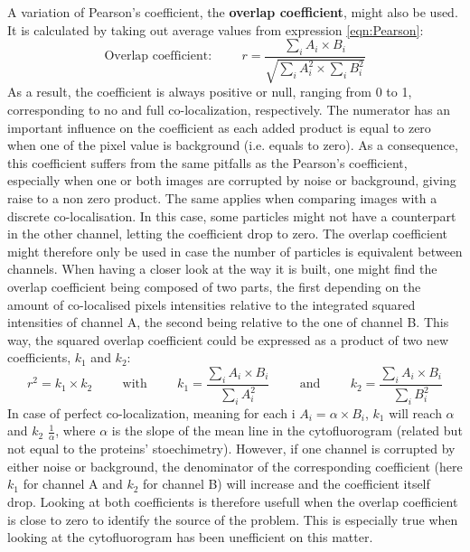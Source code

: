 \documentclass[]{spie}  %
\begin{document}
A variation of Pearson's coefficient, the \textbf{overlap coefficient}\cite{Manders1993}, might also be used. It is calculated by taking out average values from expression \ref{eqn:Pearson}:
\begin{equation}
\mbox{Overlap coefficient:} \hspace{1cm}r=\frac{\sum_{i}A_i\times B_i}{\sqrt{\sum_{i}A_i^2\times\sum_iB_i^2}}
\label{eqn:Overlap}
\end{equation}
As a result, the coefficient is always positive or null, ranging from 0 to 1, corresponding to no and full co-localization, respectively. The numerator has an important influence on the coefficient as each added product is equal to zero when one of the pixel value is background (i.e. equals to zero). As a consequence, this coefficient suffers from the same pitfalls as the Pearson's coefficient, especially when one or both images are corrupted by noise or background, giving raise to a non zero product. The same applies when comparing images with a discrete co-localisation. In this case, some particles might not have a counterpart in the other channel, letting the coefficient drop to zero. The overlap coefficient might therefore only be used in case the number of particles is equivalent between channels. When having a closer look at the way it is built, one might find the overlap coefficient being composed of two parts, the first depending on the amount of co-localised pixels intensities relative to the integrated squared intensities of channel A, the second being relative to the one of channel B. This way, the squared overlap coefficient could be expressed as a product of two new coefficients, \textbf{$k_1$} and \textbf{$k_2$}:
\begin{equation}
r^2=k_1\times k_2 \hspace{1cm} \mbox{with} \hspace{1cm} k_1=\frac{\sum_{i}A_i\times B_i}{\sum_{i}A_i^2} \hspace{1cm} \mbox{and} \hspace{1cm} k_2=\frac{\sum_{i}A_i\times B_i}{\sum_{i}B_i^2}
\label{eqn:k1k2}
\end{equation}
In case of perfect co-localization, meaning for each i $A_i=\alpha\times B_i$, $k_{1}$ will reach $\alpha$ and $k_{2}$ $\frac{1}{\alpha}$, where $\alpha$ is the slope of the mean line in the cytofluorogram (related but not equal to the proteins' stoechimetry). However, if one channel is corrupted by either noise or background, the denominator of the corresponding coefficient (here $k_1$ for channel A and $k_2$ for channel B) will increase and the coefficient itself drop. Looking at both coefficients is therefore usefull when the overlap coefficient is close to zero to identify the source of the problem. This is especially true when looking at the cytofluorogram has been unefficient on this matter. \\\\
\end{document}
